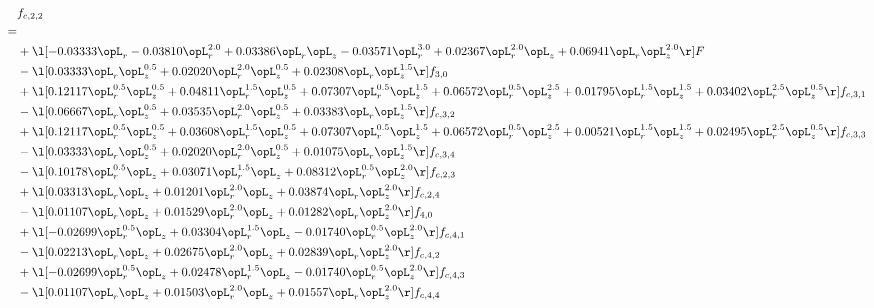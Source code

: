 \begin{alignat}{2} 
\label{eq:f_22_2} 
& f_{c,2,2} \nonumber \\ 
 = \\ 
& + \l[  -0.03333 \opL_r   -0.03810 \opL_r^{2.0} +  0.03386 \opL_r \opL_z   -0.03571 \opL_r^{3.0} +  0.02367 \opL_r^{2.0} \opL_z +  0.06941 \opL_r \opL_z^{2.0}  \r] F \nonumber \\ 
& - \l[  0.03333 \opL_r \opL_z^{0.5} +  0.02020 \opL_r^{2.0} \opL_z^{0.5} +  0.02308 \opL_r \opL_z^{1.5}  \r] f_{3,0} \nonumber \\ 
& + \l[  0.12117 \opL_r^{0.5} \opL_z^{0.5} +  0.04811 \opL_r^{1.5} \opL_z^{0.5} +  0.07307 \opL_r^{0.5} \opL_z^{1.5} +  0.06572 \opL_r^{0.5} \opL_z^{2.5} +  0.01795 \opL_r^{1.5} \opL_z^{1.5} +  0.03402 \opL_r^{2.5} \opL_z^{0.5}  \r] f_{c,3,1} \nonumber \\ 
& - \l[  0.06667 \opL_r \opL_z^{0.5} +  0.03535 \opL_r^{2.0} \opL_z^{0.5} +  0.03383 \opL_r \opL_z^{1.5}  \r] f_{c,3,2} \nonumber \\ 
& + \l[  0.12117 \opL_r^{0.5} \opL_z^{0.5} +  0.03608 \opL_r^{1.5} \opL_z^{0.5} +  0.07307 \opL_r^{0.5} \opL_z^{1.5} +  0.06572 \opL_r^{0.5} \opL_z^{2.5} +  0.00521 \opL_r^{1.5} \opL_z^{1.5} +  0.02495 \opL_r^{2.5} \opL_z^{0.5}  \r] f_{c,3,3} \nonumber \\ 
& - \l[  0.03333 \opL_r \opL_z^{0.5} +  0.02020 \opL_r^{2.0} \opL_z^{0.5} +  0.01075 \opL_r \opL_z^{1.5}  \r] f_{c,3,4} \nonumber \\ 
& - \l[  0.10178 \opL_r^{0.5} \opL_z +  0.03071 \opL_r^{1.5} \opL_z +  0.08312 \opL_r^{0.5} \opL_z^{2.0}  \r] f_{c,2,3} \nonumber \\ 
& + \l[  0.03313 \opL_r \opL_z +  0.01201 \opL_r^{2.0} \opL_z +  0.03874 \opL_r \opL_z^{2.0}  \r] f_{c,2,4} \nonumber \\ 
& - \l[  0.01107 \opL_r \opL_z +  0.01529 \opL_r^{2.0} \opL_z +  0.01282 \opL_r \opL_z^{2.0}  \r] f_{4,0} \nonumber \\ 
& + \l[  -0.02699 \opL_r^{0.5} \opL_z +  0.03304 \opL_r^{1.5} \opL_z   -0.01740 \opL_r^{0.5} \opL_z^{2.0}  \r] f_{c,4,1} \nonumber \\ 
& - \l[  0.02213 \opL_r \opL_z +  0.02675 \opL_r^{2.0} \opL_z +  0.02839 \opL_r \opL_z^{2.0}  \r] f_{c,4,2} \nonumber \\ 
& + \l[  -0.02699 \opL_r^{0.5} \opL_z +  0.02478 \opL_r^{1.5} \opL_z   -0.01740 \opL_r^{0.5} \opL_z^{2.0}  \r] f_{c,4,3} \nonumber \\ 
& - \l[  0.01107 \opL_r \opL_z +  0.01503 \opL_r^{2.0} \opL_z +  0.01557 \opL_r \opL_z^{2.0}  \r] f_{c,4,4} \nonumber \\ 
\end{alignat} 


